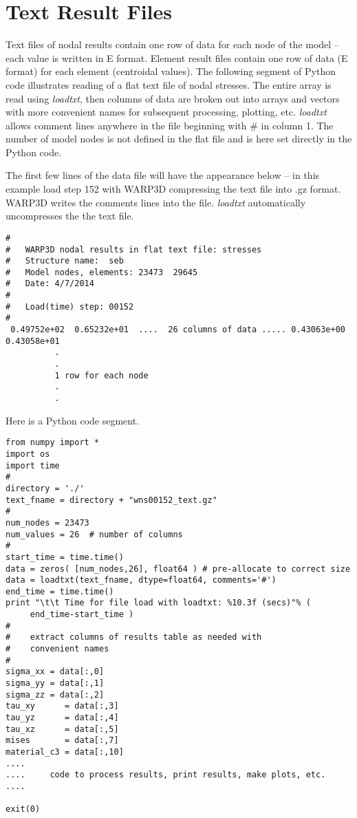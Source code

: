 \documentclass[10pt]{report}
\numberwithin{equation}{section}
\newcommand{\ti}{\emph}
\begin{document}
\noindent

%
%

\section{Text Result Files }

Text files of nodal results contain one row of data for each node of the model -- each value
is written in E format.
Element result files contain one row of data (E format) for each element (centroidal values).
The following segment of Python code illustrates reading of a flat text file of nodal stresses. 
The entire array
is read using \ti{loadtxt}, then columns of data are broken out into arrays and vectors with
more convenient names for subsequent processing, plotting, etc. \ti{loadtxt} allows comment 
lines anywhere in the file
beginning with \# in column 1. The number of model nodes is not defined in the flat file and is here
set directly in the Python code.

The first few lines of the data file will have the appearance below -- in this example load step 152 with
WARP3D compressing the text file into .gz format.  WARP3D writes the comments lines
into the file. \ti{loadtxt} automatically uncompresses the the text file.
\small
\begin{verbatim}
#
#   WARP3D nodal results in flat text file: stresses
#   Structure name:  seb
#   Model nodes, elements: 23473  29645
#   Date: 4/7/2014
#
#   Load(time) step: 00152
#
 0.49752e+02  0.65232e+01  ....  26 columns of data ..... 0.43063e+00  0.43058e+01 
          .
          .
          1 row for each node
          .
          . 
\end{verbatim}
\normalsize

Here is a Python code segment. 
\small
\begin{verbatim}
from numpy import *
import os
import time
#
directory = './'
text_fname = directory + "wns00152_text.gz"
#
num_nodes = 23473
num_values = 26  # number of columns
#
start_time = time.time()
data = zeros( [num_nodes,26], float64 ) # pre-allocate to correct size
data = loadtxt(text_fname, dtype=float64, comments='#')
end_time = time.time()
print "\t\t Time for file load with loadtxt: %10.3f (secs)"% ( 
     end_time-start_time ) 
#
#    extract columns of results table as needed with 
#    convenient names
# 
sigma_xx = data[:,0] 
sigma_yy = data[:,1]  
sigma_zz = data[:,2]  
tau_xy      = data[:,3]  
tau_yz      = data[:,4]  
tau_xz      = data[:,5]
mises       = data[:,7]
material_c3 = data[:,10]
....
....     code to process results, print results, make plots, etc.
....

exit(0)
\end{verbatim}
\normalsize
\end{document}
